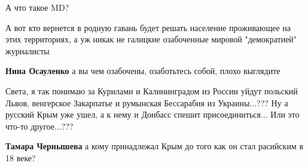 \begin{itemize}
 
А что такое MD?

 
А вот кто вернется в родную гавань будет решать население проживающее на этих территориях, а уж никак не галицкие озабоченные мировой "демократией" журналисты

\begin{itemize}
 
\textbf{Нина Осауленко} а вы чем озабочены, озаботьтесь собой, плохо выглядите
\end{itemize}

 

Света, я так понимаю за Курилами и Калининградом из России уйдут польский
Львов, венгерское Закарпатье и румынская Бессарабия из Украины...??? Ну а
русский Крым уже ушел, а к нему и Донбасс спешит присоединиться... Или это
что-то другое...???

\begin{itemize}
 
\textbf{Тамара Чернышева} а кому принадлежал Крым до того как он стал расийским в 18 веке?
\end{itemize}

 

\end{itemize}
